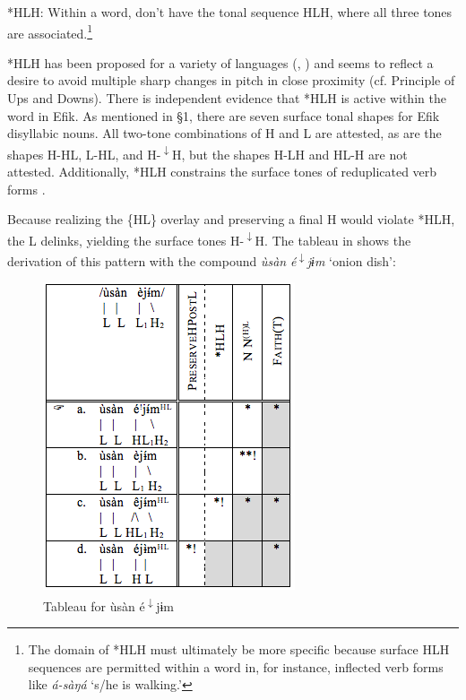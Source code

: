 \documentclass[output=paper]{langscibook}
\begin{document}
\ea\label{ex:glewwe:4} 
{*HLH: Within a word, don’t have the tonal sequence HLH, where all three tones are associated.\footnote{The domain of *HLH must ultimately be more specific because surface HLH sequences are permitted within a word in, for instance, inflected verb forms like \textit{á-sàŋá} ‘s/he is walking.’} }\\
\z

*HLH has been proposed for a variety of languages (\citealt{Cahill2007b}, \citealt{McPherson2016c}) and seems to reflect a desire to avoid multiple sharp changes in pitch in close proximity (cf.  Principle of Ups and Downs). There is independent evidence that *HLH is active within the word in Efik. As mentioned in §1, there are seven surface tonal shapes for Efik disyllabic nouns. All two-tone combinations of H and L are attested, as are the shapes H-HL, L-HL, and H-\textsuperscript{$\downarrow$}H, but the shapes H-LH and HL-H are not attested. Additionally, *HLH constrains the surface tones of reduplicated verb forms \citep{Glewwe2017}.

Because realizing the \{HL\} overlay and preserving a final H would violate *HLH, the L delinks, yielding the surface tones H-\textsuperscript{$\downarrow$}H. The tableau in  shows the derivation of this pattern with the compound \textit{ùsàn} \textit{é\textsuperscript{$\downarrow$}}\textit{jɨm} ‘onion dish’: 

  
\begin{figure}
\includegraphics[width=\textwidth]{figures/glewwe-img5.png}
\caption{Tableau for \textup{ùsàn é}\textup{\textsuperscript{$\downarrow$}}\textup{jɨm}}
\label{fig:glewwe:6}
\end{figure}
\end{document}
